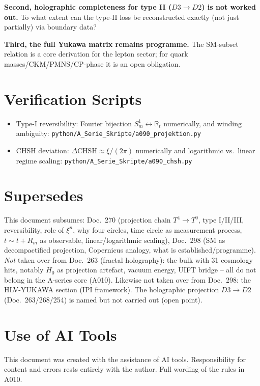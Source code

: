 \textbf{Second, holographic completeness for type II ($D3\to D2$) is not worked
out.} To what extent can the type-II loss be reconstructed exactly (not just
partially) via boundary data?

\textbf{Third, the full Yukawa matrix remains programme.} The SM-subset relation
is a core derivation for the lepton sector; for quark masses/CKM/PMNS/CP-phase
it is an open obligation.

\section{Verification Scripts}

\begin{itemize}[leftmargin=2em,itemsep=2pt,topsep=2pt]
  \item Type-I reversibility: Fourier bijection $S^1_m\leftrightarrow\mathbb{R}_t$
    numerically, and winding ambiguity:
    \texttt{python/A\_Serie\_Skripte/a090\_projektion.py}
  \item CHSH deviation: $\Delta\text{CHSH}\approx\xi/(2\pi)$ numerically and
    logarithmic vs.\ linear regime scaling:
    \texttt{python/A\_Serie\_Skripte/a090\_chsh.py}
\end{itemize}

\section{Supersedes}

This document subsumes: Doc.~270 (projection chain $T^4\to T^0$, type I/II/III,
reversibility, role of $\xi^n$, why four circles, time circle as measurement
process, $t\sim t+R_m$ as observable, linear/logarithmic scaling), Doc.~298 (SM
as decompactified projection, Copernicus analogy, what is established/programme).
\emph{Not} taken over from Doc.~263 (fractal holography): the bulk with 31
cosmology hits, notably $H_0$ as projection artefact, vacuum energy, UIFT bridge
-- all do not belong in the A-series core (A010). Likewise not taken over from
Doc.~298: the HLV-YUKAWA section (IPI framework). The holographic projection
$D3\to D2$ (Doc.~263/268/254) is named but not carried out (open point).

\section{Use of AI Tools}

This document was created with the assistance of AI tools.
Responsibility for content and errors rests entirely with the author.
Full wording of the rules in A010.

